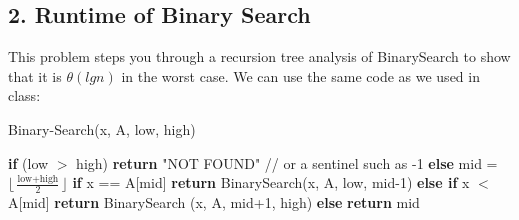 \documentclass[12pt]{article}
\begin{document}
\subsection*{2. Runtime of Binary Search}
This problem steps you through a recursion tree analysis of BinarySearch to show that it is $\theta(lgn)$ in the worst case. We can use the same code as we used in class: \\
\begin{algorithm}
\caption{Binary-Search(x, A, low, high)}
\begin{algorithmic}[1]
\State \textbf{if} (low $>$ high) 
\State \textbf{return} "NOT FOUND" // or a sentinel such as -1
\State \textbf{else}
\State \qquad mid = $\lfloor \frac{\text{low} + \text{high}}{2} \rfloor $
\State \qquad \textbf{if} x == A[mid]
\State \qquad \qquad \textbf{return} BinarySearch(x, A, low, mid-1)
\State \qquad \textbf{else if} x $<$ A[mid]
\State \qquad \qquad \textbf{return} BinarySearch (x, A, mid+1, high)
\State \qquad \textbf{else} 
\State \textbf{return} mid
\end{algorithmic}
\end{algorithm}
\linebreak
\end{document}
